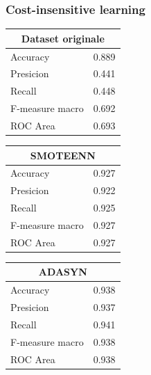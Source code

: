 \documentclass[italian,12pt,a4paper]{article}
\begin{document}
	\subsubsection{Cost-insensitive learning}

	
	\begin{center}
	
	   \begin{table}[h]
		\footnotesize
		\begin{tabular}{|p{2cm}|c|}
			\hline
			\multicolumn{2}{|c|}{Dataset originale}\\ \hline
				Accuracy & 0.889 \\ \hline
				Presicion & 0.441 \\ \hline
				Recall & 0.448 \\ \hline
				F-measure macro & 0.692 \\ \hline
				ROC Area & 0.693 \\ \hline
		\end{tabular}
		\hfill
		\begin{tabular}{|p{2cm}|c|}
			\hline
			\multicolumn{2}{|c|}{SMOTEENN}\\ \hline
				Accuracy & 0.927 \\ \hline
				Presicion & 0.922 \\ \hline
				Recall & 0.925 \\ \hline
				F-measure macro & 0.927 \\ \hline
				ROC Area & 0.927 \\ \hline  
		\end{tabular}
		\hfill
		\begin{tabular}{|p{2cm}|r|} \hline
			\multicolumn{2}{|c|}{ADASYN}\\ \hline
				Accuracy & 0.938 \\ \hline
				Presicion & 0.937 \\ \hline
				Recall & 0.941 \\ \hline
				F-measure macro & 0.938 \\ \hline
				ROC Area & 0.938 \\ \hline  
		\end{tabular}
	\end{table}
	

\end{center}
\end{document}
